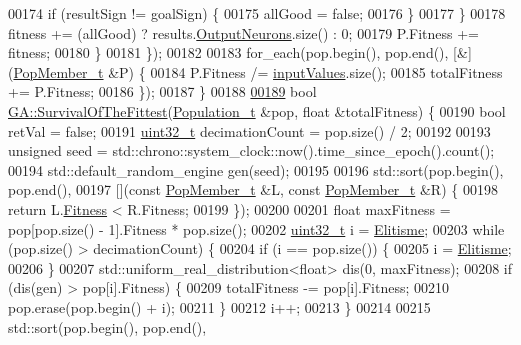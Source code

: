 \begin{DoxyCode}
00174         \textcolor{keywordflow}{if} (resultSign != goalSign) \{
00175           allGood = \textcolor{keyword}{false};
00176         \}
00177       \}
00178       fitness += (allGood) ? results.\hyperlink{struct_predict__struct_aa0708cae93baa061f21452537e86d3bd}{OutputNeurons}.size() : 0;
00179       P.Fitness += fitness;
00180     \}
00181   \});
00182 
00183   for\_each(pop.begin(), pop.end(), [&](\hyperlink{struct_pop_member_struct}{PopMember\_t} &P) \{
00184     P.Fitness /= \hyperlink{class_soil_math_1_1_g_a_a99276ad62b9616d0f18becc4fbb22980}{inputValues}.size();
00185     totalFitness += P.Fitness;
00186   \});
00187 \}
00188 
\hypertarget{_g_a_8cpp_source_l00189}{}\hyperlink{class_soil_math_1_1_g_a_ac2c10631815408d044738f678c67e98b}{00189} \textcolor{keywordtype}{bool} \hyperlink{class_soil_math_1_1_g_a_ac2c10631815408d044738f678c67e98b}{GA::SurvivalOfTheFittest}(\hyperlink{_soil_math_types_8h_a8d2d4c736cf817d048a2d66dec8b12ec}{Population\_t} &pop, \textcolor{keywordtype}{float} &totalFitness) \{
00190   \textcolor{keywordtype}{bool} retVal = \textcolor{keyword}{false};
00191   \hyperlink{_soil_math_types_8h_a435d1572bf3f880d55459d9805097f62}{uint32\_t} decimationCount = pop.size() / 2;
00192 
00193   \textcolor{keywordtype}{unsigned} seed = std::chrono::system\_clock::now().time\_since\_epoch().count();
00194   std::default\_random\_engine gen(seed);
00195 
00196   std::sort(pop.begin(), pop.end(),
00197             [](\textcolor{keyword}{const} \hyperlink{struct_pop_member_struct}{PopMember\_t} &L, \textcolor{keyword}{const} \hyperlink{struct_pop_member_struct}{PopMember\_t} &R) \{
00198               \textcolor{keywordflow}{return} L.\hyperlink{struct_pop_member_struct_a750ec8010731e3e2a876051475c31b14}{Fitness} < R.Fitness;
00199             \});
00200 
00201   \textcolor{keywordtype}{float} maxFitness = pop[pop.size() - 1].Fitness * pop.size();
00202   \hyperlink{_soil_math_types_8h_a435d1572bf3f880d55459d9805097f62}{uint32\_t} i = \hyperlink{class_soil_math_1_1_g_a_a381e62f146aacfa86fec6e0dc40053ab}{Elitisme};
00203   \textcolor{keywordflow}{while} (pop.size() > decimationCount) \{
00204     \textcolor{keywordflow}{if} (i == pop.size()) \{
00205       i = \hyperlink{class_soil_math_1_1_g_a_a381e62f146aacfa86fec6e0dc40053ab}{Elitisme};
00206     \}
00207     std::uniform\_real\_distribution<float> dis(0, maxFitness);
00208     \textcolor{keywordflow}{if} (dis(gen) > pop[i].Fitness) \{
00209       totalFitness -= pop[i].Fitness;
00210       pop.erase(pop.begin() + i);
00211     \}
00212     i++;
00213   \}
00214 
00215   std::sort(pop.begin(), pop.end(),

\end{DoxyCode}
